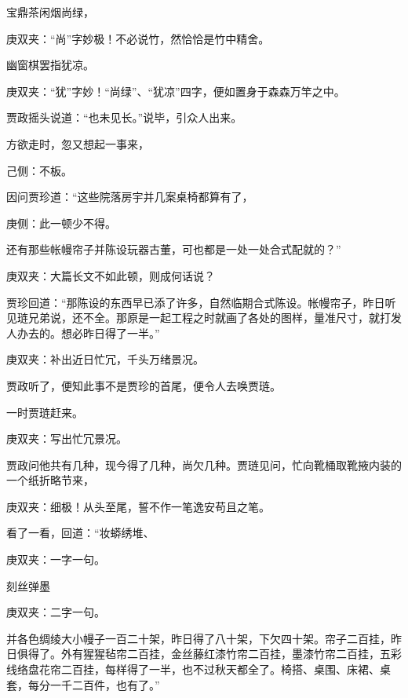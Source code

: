 \begin{poem}
    \begin{pl}宝鼎茶闲烟尚绿，\end{pl}
    \begin{note}庚双夹：“尚”字妙极！不必说竹，然恰恰是竹中精舍。\end{note}

    \begin{pl}幽窗棋罢指犹凉。\end{pl}
    \begin{note}庚双夹：“犹”字妙！“尚绿”、“犹凉”四字，便如置身于森森万竿之中。\end{note}
\end{poem}


\begin{parag}
    贾政摇头说道：“也未见长。”说毕，引众人出来。
\end{parag}


\begin{parag}
    方欲走时，忽又想起一事来，\begin{note}己侧：不板。\end{note}因问贾珍道：“这些院落房宇并几案桌椅都算有了，\begin{note}庚侧：此一顿少不得。\end{note}还有那些帐幔帘子并陈设玩器古董，可也都是一处一处合式配就的？”\begin{note}庚双夹：大篇长文不如此顿，则成何话说？\end{note}贾珍回道：“那陈设的东西早已添了许多，自然临期合式陈设。帐幔帘子，昨日听见琏兄弟说，还不全。那原是一起工程之时就画了各处的图样，量准尺寸，就打发人办去的。想必昨日得了一半。”\begin{note}庚双夹：补出近日忙冗，千头万绪景况。\end{note}贾政听了，便知此事不是贾珍的首尾，便令人去唤贾琏。
\end{parag}


\begin{parag}
    一时贾琏赶来。\begin{note}庚双夹：写出忙冗景况。\end{note}贾政问他共有几种，现今得了几种，尚欠几种。贾琏见问，忙向靴桶取靴掖内装的一个纸折略节来，\begin{note}庚双夹：细极！从头至尾，誓不作一笔逸安苟且之笔。\end{note}看了一看，回道：“妆蟒绣堆、\begin{note}庚双夹：一字一句。\end{note}刻丝弹墨\begin{note}庚双夹：二字一句。\end{note}并各色绸绫大小幔子一百二十架，昨日得了八十架，下欠四十架。帘子二百挂，昨日俱得了。外有猩猩毡帘二百挂，金丝藤红漆竹帘二百挂，墨漆竹帘二百挂，五彩线络盘花帘二百挂，每样得了一半，也不过秋天都全了。椅搭、桌围、床裙、桌套，每分一千二百件，也有了。”
\end{parag}



